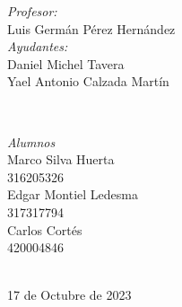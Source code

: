 \begin{titlepage}
    \vspace{10mm}
    \begin{minipage}{0.7\textwidth}
        \begin{flushleft} \large
            \emph{Profesor:}\\
                Luis Germán Pérez Hernández\\
                \vspace{3mm}
                \emph{Ayudantes:}\\
                Daniel Michel Tavera\\
                Yael Antonio Calzada Martín\\
        \end{flushleft}
    \end{minipage}
    \\
    \vspace{10mm}
    \begin{minipage}{0.4\textwidth}
        \begin{flushright} \large
        \centering
            \emph{Alumnos} \\ %
            \vspace{3mm}
            Marco Silva Huerta\\
            316205326\\
            \vspace{4mm}
            Edgar Montiel Ledesma\\
            317317794\\
            \vspace{4mm}
            Carlos Cortés\\
            420004846
        \end{flushright}
    \end{minipage}\\[1.2cm]
    \makeatother
    {\large 17 de Octubre de 2023}\\[2cm]
    \vfill 
    \end{titlepage}
